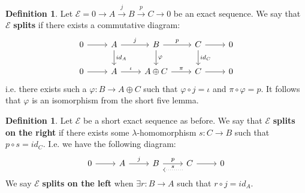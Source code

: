 \documentclass[12pt]{book}
\theoremstyle{definition}
\newtheorem{definition}[theorem]{Definition}
\begin{document}
\begin{definition}
    Let $\mathcal{E} = 0 \rightarrow A \xrightarrow{j} B \xrightarrow{p} C \rightarrow 0$ be an exact sequence. We say that $\mathcal{E}$ \textbf{splits} if there exists a commutative diagram: 
        \[
        \begin{tikzcd}
        0 \arrow[r] & A \arrow[r, "j"] \arrow[d, "id_A"] 
        & B \arrow[r, "p"] \arrow[d, "\varphi"] 
        & C \arrow[r] \arrow[d, "id_C"] 
        & 0 \\
        0 \arrow[r] & A \arrow[r, "\iota"] 
        & A \oplus C \arrow[r, "\pi"] 
        & C \arrow[r] 
        & 0
        \end{tikzcd}
        \]
    i.e. there exists such a $\varphi : B \rightarrow A \oplus C$ such that $\varphi \circ j = \iota$ and $\pi \circ \varphi = p$. It follows that $\varphi$ is an isomorphism from the short five lemma. 
\end{definition}

\begin{definition}
    Let $\mathcal{E}$ be a short exact sequence as before. We say that $\mathcal{E}$ \textbf{splits on the right} if there exists some $\lambda$-homomorphism $s : C \rightarrow B$ such that $p \circ s = id_C$. I.e. we have the following diagram: 
    \[
    \begin{tikzcd}
    0 \arrow[r]
    & A \arrow[r, "j"]
    & B \arrow[r, "p"]
    & C \arrow[r]
    & 0
    \arrow[from=1-4, to=1-3, dotted, "s"', shift left=3]
    \end{tikzcd}
    \]
    We say $\mathcal{E}$ \textbf{splits on the left} when $\exists r : B \rightarrow A$ such that $r \circ j = id_A$.
\end{definition}
\end{document}
